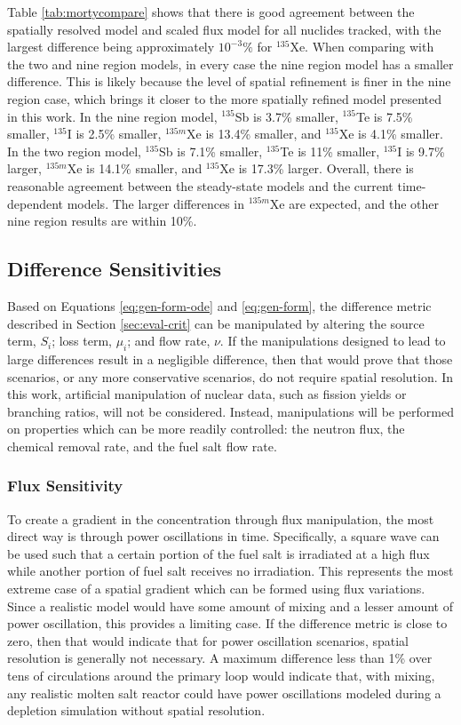 \documentclass{style/nseJournal}
\begin{document}
Table \ref{tab:mortycompare} shows that there is good agreement between the spatially resolved model and scaled flux model for all nuclides tracked, with the largest difference being approximately $10^{-3}\%$ for $^{135}$Xe.
When comparing with the two and nine region models, in every case the nine region model has a smaller difference.
This is likely because the level of spatial refinement is finer in the nine region case, which brings it closer to the more spatially refined model presented in this work.
In the nine region model, $^{135}$Sb is 3.7\% smaller, $^{135}$Te is 7.5\% smaller, $^{135}$I is 2.5\% smaller, $^{135m}$Xe is 13.4\% smaller, and $^{135}$Xe is 4.1\% smaller.
In the two region model, $^{135}$Sb is 7.1\% smaller, $^{135}$Te is 11\% smaller, $^{135}$I is 9.7\% larger, $^{135m}$Xe is 14.1\% smaller, and $^{135}$Xe is 17.3\% larger.
Overall, there is reasonable agreement between the steady-state models and the current time-dependent models.
The larger differences in $^{135m}$Xe are expected, and the other nine region results are within 10\%.

\subsection{Difference Sensitivities}

Based on Equations \eqref{eq:gen-form-ode} and \eqref{eq:gen-form}, the difference metric described in Section \ref{sec:eval-crit} can be manipulated by altering the source term, $S_i$; loss term, $\mu_i$; and flow rate, $\nu$.
If the manipulations designed to lead to large differences result in a negligible difference, then that would prove that those scenarios, or any more conservative scenarios, do not require spatial resolution.
In this work, artificial manipulation of nuclear data, such as fission yields or branching ratios, will not be considered.
Instead, manipulations will be performed on properties which can be more readily controlled: the neutron flux, the chemical removal rate, and the fuel salt flow rate.
\FloatBarrier

\subsubsection{Flux Sensitivity}

To create a gradient in the concentration through flux manipulation, the most direct way is through power oscillations in time.
Specifically, a square wave can be used such that a certain portion of the fuel salt is irradiated at a high flux while another portion of fuel salt receives no irradiation.
This represents the most extreme case of a spatial gradient which can be formed using flux variations.
Since a realistic model would have some amount of mixing and a lesser amount of power oscillation, this provides a limiting case.
If the difference metric is close to zero, then that would indicate that for power oscillation scenarios, spatial resolution is generally not necessary.
A maximum difference less than 1\% over tens of circulations around the primary loop would indicate that, with mixing, any realistic molten salt reactor could have power oscillations modeled during a depletion simulation without spatial resolution.
\end{document}
